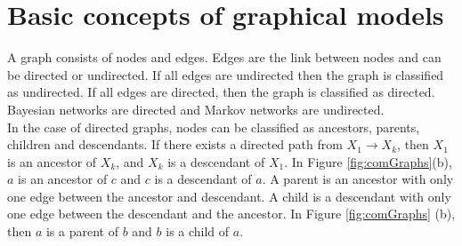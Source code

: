 \documentclass[12pt,oneside,openany,a4paper, %
afrikaans,english,
]{memoir}
\numberwithin{equation}{chapter}
\begin{document}
\section{Basic concepts of graphical models}
A graph consists of nodes and edges. Edges are the link between nodes and can be directed or undirected. If all edges are undirected then the graph is classified as undirected. If all edges are directed, then the graph is classified as directed. Bayesian networks are directed and Markov networks are undirected.\\
In the case of directed graphs, nodes can be classified as ancestors, parents, children and descendants. If there exists a directed path from $X_1 \to X_k$, then $X_1$ is an ancestor of $X_k$, and $X_k$ is a descendant of $X_1$. In Figure \ref{fig:comGraphs}(b), $a$ is an ancestor of $c$ and $c$ is a descendant of $a$. A parent is an ancestor with only one edge between the ancestor and descendant. A child is a descendant with only one edge between the descendant and the ancestor. In Figure \ref{fig:comGraphs} (b), then $a$ is a parent of $b$ and $b$ is a child of $a$.~\cite{barber}
\end{document}
